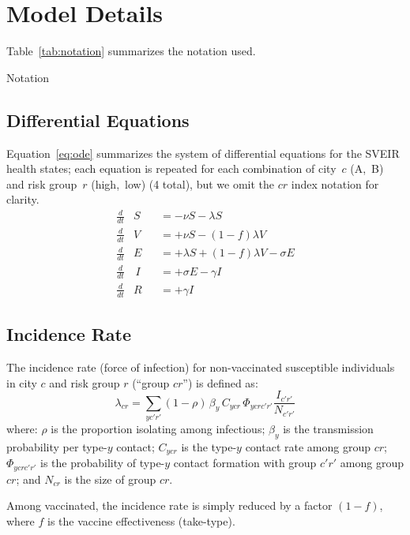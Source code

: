 \section{Model Details}\label{app.model}
Table~\ref{tab:notation} summarizes the notation used.
\begin{table}[h]
  \centering
  \caption{Notation}
  \label{tab:notation}
  
\end{table}
\subsection{Differential Equations}\label{app.model.eqn}
Equation~\eqref{eq:ode} summarizes the system of differential equations for the SVEIR health states;
each equation is repeated for each combination of city~$c$ (A,~B) and risk group~$r$ (high,~low) (4 total),
but we omit the $cr$ index notation for clarity.
\begin{subequations}\label{eq:ode}
  \begin{alignat}{5}
    \frac{d}{dt}&S   &&= - \nu S - \lambda S \\
    \frac{d}{dt}&V   &&= + \nu S - (1 - f) \lambda V \\
    \frac{d}{dt}&E   &&= + \lambda S + (1-f) \lambda V - \sigma E\\
    \frac{d}{dt}&\,I &&= + \sigma E - \gamma I \\
    \frac{d}{dt}&R   &&= + \gamma I
  \end{alignat}
\end{subequations}
\subsection{Incidence Rate}\label{app.model.inc}
The incidence rate (force of infection) for
non-vaccinated susceptible individuals in city $c$ and risk group $r$ (``group $cr$'') is defined as:
\begin{equation}
  \lambda_{cr} = \sum_{yc'r'} (1 - \rho)\,\beta_{y}\,C_{ycr}\,\Phi_{ycrc'r'} \frac{I_{c'r'}}{N_{c'r'}}
\end{equation}
where:
$\rho$ is the proportion isolating among infectious;
$\beta_{y}$ is the transmission probability per type-$y$ contact;
$C_{ycr}$ is the type-$y$ contact rate among group $cr$;
$\Phi_{ycrc'r'}$ is the probability of type-$y$ contact formation with group $c'r'$ among group $cr$; and
$N_{cr}$ is the size of group $cr$.
\par
Among vaccinated, the incidence rate is simply reduced by a factor $(1-f)$, where
$f$ is the vaccine effectiveness (take-type).
